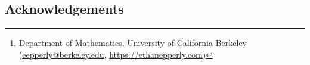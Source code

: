 \documentclass[11pt]{article}
\title{\mytitle}
\author{Ethan N. Epperly\thanks{Department of Mathematics, University of California Berkeley (\href{mailto:eepperly@berkeley.edu}{eepperly@berkeley.edu}, \url{https://ethanepperly.com})}}
\date{\today}
\begin{document}
\maketitle

\begin{abstract}
  
\end{abstract}



\subsection*{Acknowledgements}



\appendix



\scriptsize

\let\oldthebibliography=\thebibliography
\let\endoldthebibliography=\endthebibliography
\renewenvironment{thebibliography}[1]%
  {\begin{oldthebibliography}{#1}%
   \setlength{\itemsep}{2pt}%
   \setlength{\parskip}{2pt}%
  }%
  {\end{oldthebibliography}}

\end{document}
